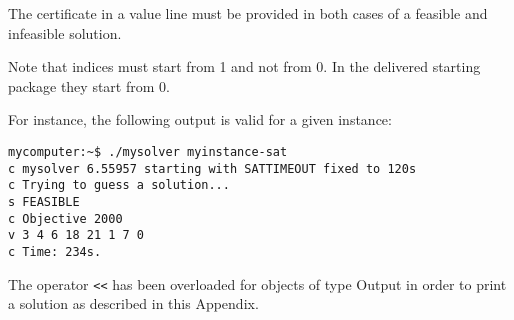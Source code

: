     The certificate in a value line must be provided in both cases of a
    feasible and infeasible solution.

    Note that indices must start from 1 and not from 0. In the delivered
    starting package they start from 0.

For instance, the following output is valid for a given instance:

\begin{verbatim}
mycomputer:~$ ./mysolver myinstance-sat
c mysolver 6.55957 starting with SATTIMEOUT fixed to 120s
c Trying to guess a solution...
s FEASIBLE
c Objective 2000
v 3 4 6 18 21 1 7 0
c Time: 234s.
\end{verbatim}


The operator \verb!<<! has been overloaded for objects of type Output in
order to print a solution as described in this Appendix. 


%


